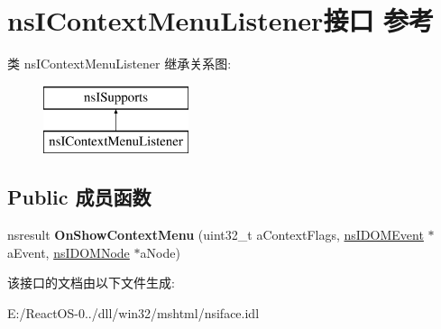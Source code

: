 \hypertarget{interfacens_i_context_menu_listener}{}\section{ns\+I\+Context\+Menu\+Listener接口 参考}
\label{interfacens_i_context_menu_listener}
类 ns\+I\+Context\+Menu\+Listener 继承关系图\+:\begin{figure}[H]
\begin{center}
\leavevmode
\includegraphics[height=2.000000cm]{interfacens_i_context_menu_listener}
\end{center}
\end{figure}
\subsection*{Public 成员函数}
\begin{DoxyCompactItemize}
\item 
\mbox{\label{interfacens_i_context_menu_listener_a1d253ffc89514e1aa318b630306f24df}} 
nsresult {\bfseries On\+Show\+Context\+Menu} (uint32\+\_\+t a\+Context\+Flags, \hyperlink{interfacens_i_d_o_m_event}{ns\+I\+D\+O\+M\+Event} $\ast$a\+Event, \hyperlink{interfacens_i_d_o_m_node}{ns\+I\+D\+O\+M\+Node} $\ast$a\+Node)
\end{DoxyCompactItemize}


该接口的文档由以下文件生成\+:\begin{DoxyCompactItemize}
\item 
E\+:/\+React\+O\+S-\/0../dll/win32/mshtml/nsiface.\+idl\end{DoxyCompactItemize}
